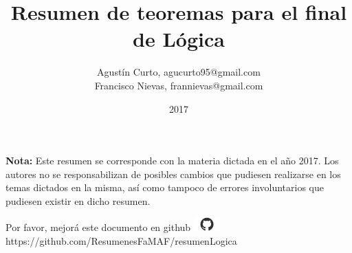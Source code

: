 \documentclass[12pt,a4paper]{article}
\author{Agustín Curto, agucurto95@gmail.com \\
			 Francisco Nievas, frannievas@gmail.com}
\title{Resumen de teoremas para el final \\ de Lógica}
\date{2017}
\newcommand{\PN}{\par\noindent}
\begin{document}
	\clearpage\maketitle
	\thispagestyle{empty}
	\tableofcontents

	\vspace{5cm}
	\PN \textbf{Nota:} Este resumen se corresponde con la materia dictada en el año 2017. Los autores no se
	responsabilizan de posibles cambios que pudiesen realizarse en los temas dictados en la misma, así como tampoco de
	errores involuntarios que pudiesen existir en dicho resumen.

	\vspace{\fill}
	\begin{center}
		Por favor, mejorá este documento en github
		\includegraphics[width=1cm]{graphics/github.png} \\
		https://github.com/ResumenesFaMAF/resumenLogica
	\end{center}
	
	\pagebreak

	
\end{document}
